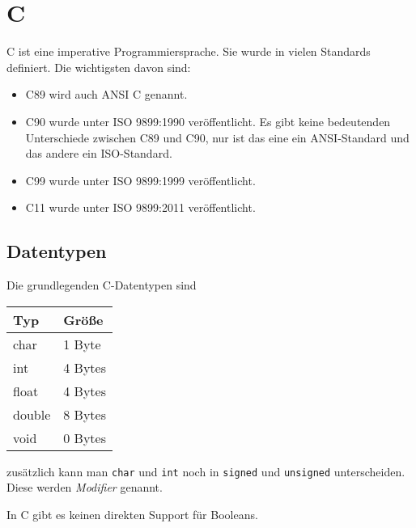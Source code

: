 \chapter{C}
C ist eine imperative Programmiersprache. Sie wurde in vielen Standards
definiert. Die wichtigsten davon sind:

\begin{itemize}
    \item C89 wird auch ANSI C genannt.
    \item C90 wurde unter ISO 9899:1990 veröffentlicht. Es gibt keine bedeutenden
          Unterschiede zwischen C89 und C90, nur ist das eine ein ANSI-Standard
          und das andere ein ISO-Standard.
    \item C99 wurde unter ISO 9899:1999 veröffentlicht.
    \item C11 wurde unter ISO 9899:2011 veröffentlicht.
\end{itemize}

\section{Datentypen}
Die grundlegenden C-Datentypen sind
\begin{table}[H]
    \centering
    \begin{tabular}{|l|l|}
    \hline
    \textbf{Typ}    & \textbf{Größe}   \\ \hline\hline
    char   & 1 Byte  \\ \hline
    int    & 4 Bytes \\ \hline
    float  & 4 Bytes \\ \hline
    double & 8 Bytes \\ \hline
    void   & 0 Bytes \\ \hline
    \end{tabular}
\end{table}

zusätzlich kann man \texttt{char} und \texttt{int}
noch in \texttt{signed} und \texttt{unsigned}
unterscheiden. Diese werden \textit{Modifier} genannt.

In C gibt es keinen direkten Support für Booleans.

